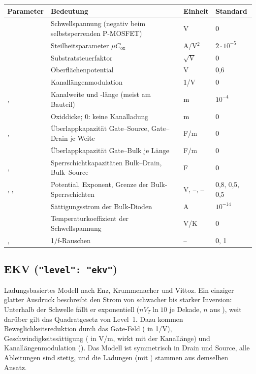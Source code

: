 \begin{longtable}{@{}lP{8.2cm}ll@{}}
  \toprule
  Parameter & Bedeutung & Einheit & Standard \\
  \midrule
  \endhead
  \bottomrule
  \endfoot
   & Schwellspannung (negativ beim selbstsperrenden P-MOSFET) & V & 0 \\
   & Steilheitsparameter $\mu C_\text{ox}$ & A/V$^2$ & $2\cdot10^{-5}$ \\
   & Substratsteuerfaktor & $\sqrt{\text{V}}$ & 0 \\
   & Oberflächenpotential & V & 0,6 \\
   & Kanallängenmodulation & 1/V & 0 \\
  ,  & Kanalweite und -länge (meist am Bauteil) & m & $10^{-4}$ \\
   & Oxiddicke; 0: keine Kanalladung & m & 0 \\
  ,  & Überlappkapazität Gate–Source, Gate–Drain je Weite & F/m & 0 \\
   & Überlappkapazität Gate–Bulk je Länge & F/m & 0 \\
  ,  & Sperrschichtkapazitäten Bulk–Drain, Bulk–Source & F & 0 \\
  , ,  & Potential, Exponent, Grenze der Bulk-Sperrschichten & V, –, – & 0,8, 0,5, 0,5 \\
   & Sättigungsstrom der Bulk-Dioden & A & $10^{-14}$ \\
   & Temperaturkoeffizient der Schwellspannung & V/K & 0 \\
  ,  & 1/f-Rauschen & – & 0, 1 \\
\end{longtable}

\subsection{EKV (\texttt{"level": "ekv"})}

Ladungsbasiertes Modell nach Enz, Krummenacher und Vittoz. Ein einziger
glatter Ausdruck beschreibt den Strom von schwacher bis starker Inversion:
Unterhalb der Schwelle fällt er exponentiell ($n V_T \ln 10$ je Dekade, $n$
aus ), weit darüber gilt das Quadratgesetz von Level~1. Dazu
kommen Beweglichkeitsreduktion durch das Gate-Feld ( in 1/V),
Geschwindigkeitssättigung ( in V/m, wirkt mit der Kanallänge)
und Kanallängenmodulation (). Das Modell ist symmetrisch in
Drain und Source, alle Ableitungen sind stetig, und die Ladungen (mit
) stammen aus demselben Ansatz.

